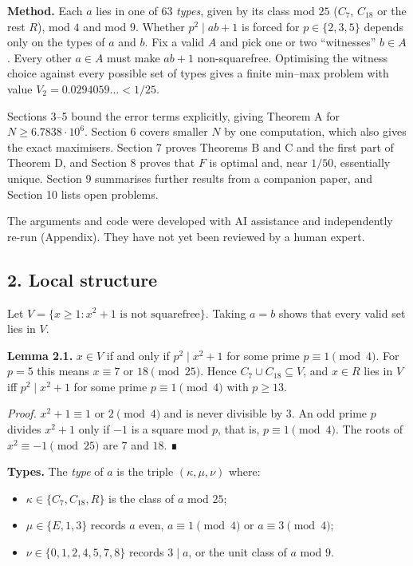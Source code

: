 \documentclass[
  11pt,
]{article}
\providecommand{\tightlist}{%
  \setlength{\itemsep}{0pt}\setlength{\parskip}{0pt}}
\begin{document}
\textbf{Method.} Each \(a\) lies in one of 63 \emph{types}, given by its
class mod \(25\) (\(C_7\), \(C_{18}\) or the rest \(R\)), mod \(4\) and
mod \(9\). Whether \(p^2 \mid ab + 1\) is forced for
\(p \in \{2, 3, 5\}\) depends only on the types of \(a\) and \(b\). Fix
a valid \(A\) and pick one or two ``witnesses'' \(b \in A\). Every other
\(a \in A\) must make \(ab + 1\) non-squarefree. Optimising the witness
choice against every possible set of types gives a finite min--max
problem with value \(V_2 = 0.0294059\dots < 1/25\).

Sections 3--5 bound the error terms explicitly, giving Theorem A for
\(N \ge 6.7838\cdot 10^{6}\). Section 6 covers smaller \(N\) by one
computation, which also gives the exact maximisers. Section 7 proves
Theorems B and C and the first part of Theorem D, and Section 8 proves
that \(F\) is optimal and, near \(1/50\), essentially unique. Section 9
summarises further results from a companion paper, and Section 10 lists
open problems.

The arguments and code were developed with AI assistance and
independently re-run (Appendix). They have not yet been reviewed by a
human expert.

\subsection{2. Local structure}

Let \(V = \{x \ge 1 : x^2 + 1 \text{ is not squarefree}\}\). Taking
\(a = b\) shows that every valid set lies in \(V\).

\textbf{Lemma 2.1.} \(x \in V\) if and only if \(p^2 \mid x^2 + 1\) for
some prime \(p \equiv 1 \pmod{4}\). For \(p = 5\) this means
\(x \equiv 7\) or \(18 \pmod{25}\). Hence
\(C_7 \cup C_{18} \subseteq V\), and \(x \in R\) lies in \(V\) iff
\(p^2 \mid x^2 + 1\) for some prime \(p \equiv 1 \pmod{4}\) with
\(p \ge 13\).

\emph{Proof.} \(x^2 + 1 \equiv 1\) or \(2 \pmod{4}\) and is never
divisible by \(3\). An odd prime \(p\) divides \(x^2 + 1\) only if
\(-1\) is a square mod \(p\), that is, \(p \equiv 1 \pmod{4}\). The
roots of \(x^2 \equiv -1 \pmod{25}\) are \(7\) and \(18\). ∎

\textbf{Types.} The \emph{type} of \(a\) is the triple
\((\kappa, \mu, \nu)\) where:

\begin{itemize}
\tightlist
\item
  \(\kappa \in \{C_7, C_{18}, R\}\) is the class of \(a\) mod \(25\);
\item
  \(\mu \in \{E, 1, 3\}\) records \(a\) even, \(a \equiv 1 \pmod{4}\) or
  \(a \equiv 3 \pmod{4}\);
\item
  \(\nu \in \{0, 1, 2, 4, 5, 7, 8\}\) records \(3 \mid a\), or the unit
  class of \(a\) mod \(9\).
\end{itemize}
\end{document}
